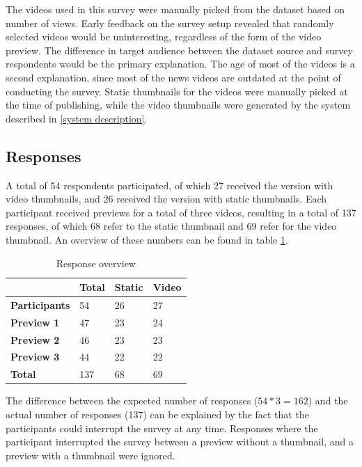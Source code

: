 \documentclass{../resources/sig-alternate-05-2015}
\begin{document}
The videos used in this survey were manually picked from the dataset based on number of views. Early feedback on the survey setup revealed that randomly selected videos would be uninteresting, regardless of the form of the video preview. The difference in target audience between the dataset source and survey respondents would be the primary explanation. The age of most of the videos is a second explanation, since most of the news videos are outdated at the point of conducting the survey. Static thumbnails for the videos were manually picked at the time of publishing, while the video thumbnails were generated by the system described in \ref{system description}.

\subsection{Responses}

A total of 54 respondents participated, of which 27 received the version with video thumbnails, and 26 received the version with static thumbnails. Each participant received previews for a total of three videos, resulting in a total of 137 responses, of which 68 refer to the static thumbnail and 69 refer for the video thumbnail. An overview of these numbers can be found in table \ref{number of responses table}.

\begin{table}[h]
\centering
\caption{Response overview}
\label{number of responses table}
\begin{tabular}{@{}llll@{}}
\textbf{}             & \textbf{Total} & \textbf{Static} & \textbf{Video} \\ \toprule
\textbf{Participants} & 54             & 26              & 27             \\ \midrule
\textbf{Preview 1}    & 47             & 23              & 24             \\
\textbf{Preview 2}    & 46             & 23              & 23             \\
\textbf{Preview 3}    & 44             & 22              & 22             \\ \bottomrule
\textbf{Total}        & 137            & 68              & 69             \\
\end{tabular}
\end{table}

The difference between the expected number of responses ($54 * 3 = 162$) and the actual number of responses (137) can be explained by the fact that the participants could interrupt the survey at any time. Responses where the participant interrupted the survey between a preview without a thumbnail, and a preview with a thumbnail were ignored.
\end{document}
